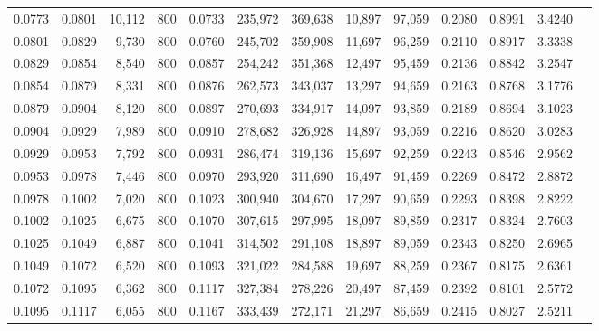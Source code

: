 \begin{tabular}{rrrrrrrrrrrrr}
0.0773 & 0.0801 & 10,112 &   800 &                                     0.0733 & 235,972 & 369,638 &  10,897 &  97,059 & 0.2080 & 0.8991 & 3.4240 \\
0.0801 & 0.0829 &  9,730 &   800 &                                     0.0760 & 245,702 & 359,908 &  11,697 &  96,259 & 0.2110 & 0.8917 & 3.3338 \\
0.0829 & 0.0854 &  8,540 &   800 &                                     0.0857 & 254,242 & 351,368 &  12,497 &  95,459 & 0.2136 & 0.8842 & 3.2547 \\
0.0854 & 0.0879 &  8,331 &   800 &                                     0.0876 & 262,573 & 343,037 &  13,297 &  94,659 & 0.2163 & 0.8768 & 3.1776 \\
0.0879 & 0.0904 &  8,120 &   800 &                                     0.0897 & 270,693 & 334,917 &  14,097 &  93,859 & 0.2189 & 0.8694 & 3.1023 \\
0.0904 & 0.0929 &  7,989 &   800 &                                     0.0910 & 278,682 & 326,928 &  14,897 &  93,059 & 0.2216 & 0.8620 & 3.0283 \\
0.0929 & 0.0953 &  7,792 &   800 &                                     0.0931 & 286,474 & 319,136 &  15,697 &  92,259 & 0.2243 & 0.8546 & 2.9562 \\
0.0953 & 0.0978 &  7,446 &   800 &                                     0.0970 & 293,920 & 311,690 &  16,497 &  91,459 & 0.2269 & 0.8472 & 2.8872 \\
0.0978 & 0.1002 &  7,020 &   800 &                                     0.1023 & 300,940 & 304,670 &  17,297 &  90,659 & 0.2293 & 0.8398 & 2.8222 \\
0.1002 & 0.1025 &  6,675 &   800 &                                     0.1070 & 307,615 & 297,995 &  18,097 &  89,859 & 0.2317 & 0.8324 & 2.7603 \\
0.1025 & 0.1049 &  6,887 &   800 &                                     0.1041 & 314,502 & 291,108 &  18,897 &  89,059 & 0.2343 & 0.8250 & 2.6965 \\
0.1049 & 0.1072 &  6,520 &   800 &                                     0.1093 & 321,022 & 284,588 &  19,697 &  88,259 & 0.2367 & 0.8175 & 2.6361 \\
0.1072 & 0.1095 &  6,362 &   800 &                                     0.1117 & 327,384 & 278,226 &  20,497 &  87,459 & 0.2392 & 0.8101 & 2.5772 \\
0.1095 & 0.1117 &  6,055 &   800 &                                     0.1167 & 333,439 & 272,171 &  21,297 &  86,659 & 0.2415 & 0.8027 & 2.5211 \\

\end{tabular}
